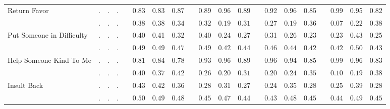 \begin{center}
{\begin{longtable}{L{5cm} c c c p{.5cm} c c c p{.5cm} c c c p{.5cm} c c c p{.5cm} c c c}
Return Favor & . &         . &         . & &      0.83 &      0.83 &      0.87 & &      0.89 &      0.96 &      0.89 & &      0.92 &      0.96 &      0.85 & &      0.99 &      0.95 &      0.82 \\*
& $\mathit{        .}$ & $\mathit{        .}$ & $\mathit{        .}$ & & $\mathit{     0.38}$ & $\mathit{     0.38}$ & $\mathit{     0.34}$ & & $\mathit{     0.32}$ & $\mathit{     0.19}$ & $\mathit{     0.31}$ & & $\mathit{     0.27}$ & $\mathit{     0.19}$ & $\mathit{     0.36}$ & & $\mathit{     0.07}$ & $\mathit{     0.22}$ & $\mathit{     0.38}$ \\[.7em]
Put Someone in Difficulty & . &         . &         . & &      0.40 &      0.41 &      0.32 & &      0.40 &      0.24 &      0.27 & &      0.31 &      0.26 &      0.23 & &      0.23 &      0.43 &      0.25 \\*
& $\mathit{        .}$ & $\mathit{        .}$ & $\mathit{        .}$ & & $\mathit{     0.49}$ & $\mathit{     0.49}$ & $\mathit{     0.47}$ & & $\mathit{     0.49}$ & $\mathit{     0.42}$ & $\mathit{     0.44}$ & & $\mathit{     0.46}$ & $\mathit{     0.44}$ & $\mathit{     0.42}$ & & $\mathit{     0.42}$ & $\mathit{     0.50}$ & $\mathit{     0.43}$ \\[.7em]
Help Someone Kind To Me & . &         . &         . & &      0.81 &      0.84 &      0.78 & &      0.93 &      0.96 &      0.89 & &      0.96 &      0.94 &      0.85 & &      0.99 &      0.96 &      0.83 \\*
& $\mathit{        .}$ & $\mathit{        .}$ & $\mathit{        .}$ & & $\mathit{     0.40}$ & $\mathit{     0.37}$ & $\mathit{     0.42}$ & & $\mathit{     0.26}$ & $\mathit{     0.20}$ & $\mathit{     0.31}$ & & $\mathit{     0.20}$ & $\mathit{     0.24}$ & $\mathit{     0.35}$ & & $\mathit{     0.10}$ & $\mathit{     0.19}$ & $\mathit{     0.38}$ \\[.7em]
Insult Back & . &         . &         . & &      0.43 &      0.42 &      0.36 & &      0.28 &      0.31 &      0.27 & &      0.24 &      0.35 &      0.28 & &      0.25 &      0.39 &      0.28 \\*
& $\mathit{        .}$ & $\mathit{        .}$ & $\mathit{        .}$ & & $\mathit{     0.50}$ & $\mathit{     0.49}$ & $\mathit{     0.48}$ & & $\mathit{     0.45}$ & $\mathit{     0.47}$ & $\mathit{     0.44}$ & & $\mathit{     0.43}$ & $\mathit{     0.48}$ & $\mathit{     0.45}$ & & $\mathit{     0.44}$ & $\mathit{     0.49}$ & $\mathit{     0.45}$ \\[.7em]
\hline
\end{longtable}
}
\end{center}
